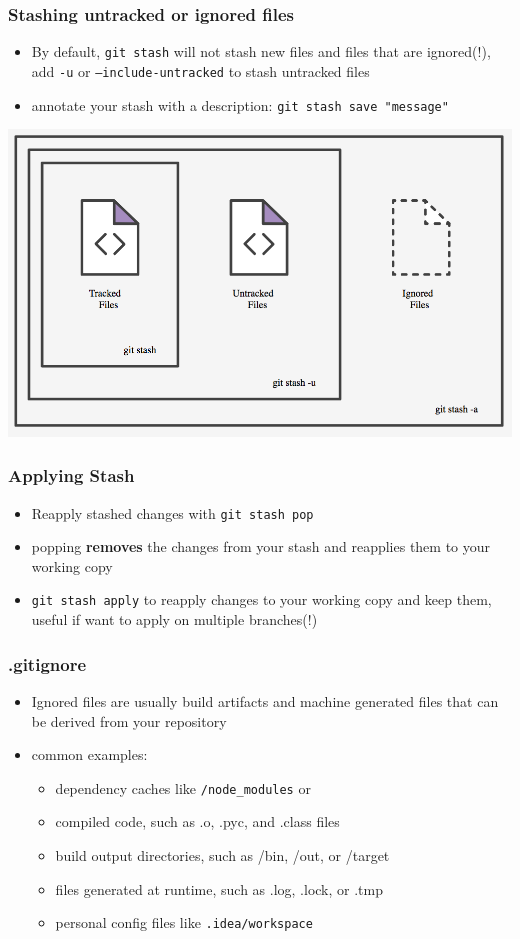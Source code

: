 \documentclass[12pt]{beamer}
\begin{document}
\begin{frame}
\frametitle{Stashing untracked or ignored files}
\begin{itemize}
	\item By default, \texttt{git stash} will not stash new files and files that are ignored(!), add \texttt{-u} or \texttt{--include-untracked} to stash untracked files
	\item annotate your stash with a description: \texttt{git stash save "message"}
\end{itemize}
\begin{center}
\includegraphics[width=0.5\linewidth]{stash_options}
\end{center}
\end{frame}

\begin{frame}
\frametitle{Applying Stash}
\begin{itemize}
	\item Reapply stashed changes with \texttt{git stash pop}
	\item popping \textbf{removes} the changes from your stash and reapplies them to your working copy
	\item \texttt{git stash apply} to reapply changes to your working copy and keep them, useful if want to apply on multiple branches(!)
\end{itemize}
\end{frame}

\begin{frame}
\frametitle{.gitignore}
\begin{itemize}
	\item Ignored files are usually build artifacts and machine generated files that can be derived from your repository 
	\item common examples:
	\begin{itemize}
		\item dependency caches like \texttt{/node\_modules} or  
		\item compiled code, such as .o, .pyc, and .class files
		\item build output directories, such as /bin, /out, or /target
		\item files generated at runtime, such as .log, .lock, or .tmp
		\item personal config files like \texttt{.idea/workspace}
	\end{itemize}
\end{itemize}
\end{frame}
\end{document}
